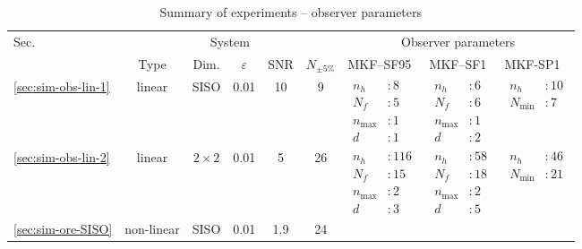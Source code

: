 \begin{table}[ht]
	\begin{center}
		\caption{Summary of experiments -- observer parameters} \label{tb:param-summary-all-sims}
		\begin{tabular}{
				l
				|
				c
				c
				c
				c
				c
				|
				>{\centering\arraybackslash}p{0.9in}
				>{\centering\arraybackslash}p{0.8in}
				>{\centering\arraybackslash}p{0.8in}
			}
			\multirow{2}{*}{Sec.}
			& \multicolumn{5}{c|}{System}
			& \multicolumn{3}{c}{Observer parameters} \\             
			& Type & Dim. & $\varepsilon$ & \acrshort{SNR} & $N_{\pm5\%}$ & MKF--SF95 & MKF--SF1 & MKF-SP1 \\
			\hline
			\ref{sec:sim-obs-lin-1} & linear & \gls{SISO} & 0.01 & 10 & 9 & 
			$\begin{aligned} n_h & :8 \\ N_f & :5 \\ n_\text{max} & :1 \\ d & :1 \end{aligned}$  & 
			$\begin{aligned} n_h & :6 \\ N_f & :6 \\ n_\text{max} & :1 \\ d & :2 \end{aligned}$  & 
			$\begin{aligned} n_h & :10 \\ N_\text{min} & :7 \end{aligned}$ \\
			\hline
			\ref{sec:sim-obs-lin-2}  &  linear & $2 \times 2$ & 0.01 & 5  & 26  &
			$\begin{aligned} n_h & :116 \\ N_f & :15 \\ n_\text{max} & :2 \\ d & :3 \end{aligned}$  & 
			$\begin{aligned} n_h & :58 \\ N_f & :18 \\ n_\text{max} & :2 \\ d & :5 \end{aligned}$  & 
			$\begin{aligned} n_h & :46 \\ N_\text{min} & :21 \end{aligned}$ \\
			\hline
			\ref{sec:sim-ore-SISO}  &  non-linear  &  \gls{SISO}  &  0.01  &  1.9  &  24 &

\end{tabular}
\end{center}
\end{table}
